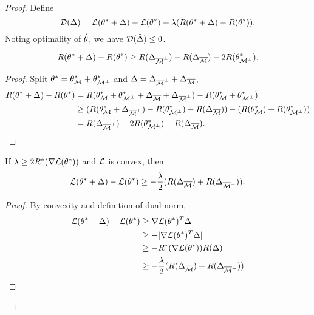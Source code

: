 \begin{proof}
    Define
    \begin{equation}
        \mathcal{D}(\Delta)=\mathcal{L}(\theta^*+\Delta)-\mathcal{L}(\theta^*)+\lambda(R(\theta^*+\Delta)-R(\theta^*)).
    \end{equation}
    Noting optimality of ${\hat{\theta}}$, we have $\mathcal{D}({\hat\Delta})\le0$.

    \begin{claim}
        \begin{equation}
            R(\theta^*+\Delta)-R(\theta^*) \ge R(\Delta_{{\overline{\mathcal{M}}}^\perp})-R(\Delta_{{\overline{\mathcal{M}}}})-2R(\theta^*_{\mathcal{M}^\perp}).
        \end{equation}
    \end{claim}

    \begin{proof}
        Split $\theta^*=\theta_{\mathcal{M}}^*+\theta^*_{\mathcal{M}^\perp}$ and $\Delta=\Delta_{{\overline{\mathcal{M}}}^\perp}+\Delta_{{\overline{\mathcal{M}}}}$,
        \begin{equation}
            \begin{split}
                R(\theta^*+\Delta) - R(\theta^*) & = R(\theta_{\mathcal{M}}^*+\theta^*_{\mathcal{M}^\perp}+\Delta_{{\overline{\mathcal{M}}}}+\Delta_{{\overline{\mathcal{M}}}^\perp}) - R(\theta_{\mathcal{M}}^*+\theta^*_{\mathcal{M}^\perp}) \\
                    & \ge (R(\theta_{\mathcal{M}}^*+\Delta_{{\overline{\mathcal{M}}}^\perp})-R(\theta^*_{\mathcal{M}^\perp}) - R(\Delta_{{\overline{\mathcal{M}}}})) - (R(\theta_{\mathcal{M}}^*) + R(\theta_{\mathcal{M}^\perp}^*))  \\
                    & = R(\Delta_{{\overline{\mathcal{M}}}^\perp})-2R(\theta^*_{\mathcal{M}^\perp}) - R(\Delta_{{\overline{\mathcal{M}}}}).
            \end{split}
        \end{equation}
    \end{proof}

    \begin{claim}
        If $\lambda\ge 2R^*(\nabla\mathcal{L}(\theta^*))$ and $\mathcal{L}$ is convex, then
        \begin{equation}
            \mathcal{L}(\theta^*+\Delta) -\mathcal{L}(\theta^*) \ge -\frac{\lambda}{2} (R(\Delta_{{\overline{\mathcal{M}}}})+R(\Delta_{{\overline{\mathcal{M}}}^\perp})).
        \end{equation}
    \end{claim}

    \begin{proof}
        By convexity and definition of dual norm,
        \begin{align}
            \mathcal{L}(\theta^*+\Delta)-\mathcal{L}(\theta^*) & \ge \nabla\mathcal{L}(\theta^*)^T\Delta \\
                & \ge-|\nabla\mathcal{L}(\theta^*)^T\Delta| \\
                & \ge -R^*(\nabla\mathcal{L}(\theta^*))R(\Delta)    \\
                & \ge -\frac{\lambda}{2}(R(\Delta_{{\overline{\mathcal{M}}}})+R(\Delta_{{\overline{\mathcal{M}}}^\perp}))
        \end{align}
    \end{proof}


\end{proof}

